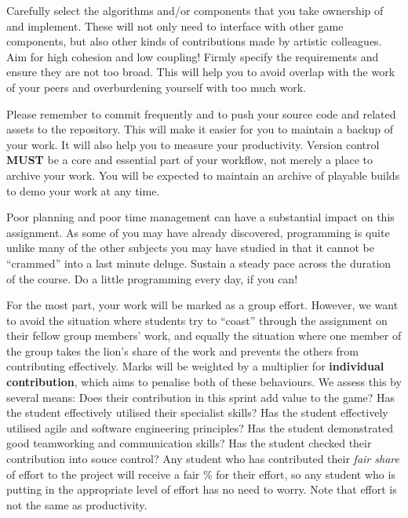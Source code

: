 \documentclass{../../fal_assignment}
\begin{document}
Carefully select the algorithms and/or components that you take ownership of and implement. These will not only need to interface with other game components, but also other kinds of contributions made by artistic colleagues. Aim for high cohesion and low coupling! Firmly specify the requirements and ensure they are not too broad. This will help you to avoid overlap with the work of your peers and overburdening yourself with too much work. 

Please remember to commit frequently and to push your source code and related assets to the repository. This will make it easier for you to maintain a backup of your work. It will also help you to measure your productivity. Version control \textbf{MUST} be a core and essential part of your workflow, not merely a place to archive your work. You will be expected to maintain an archive of playable builds to demo your work at any time.

Poor planning and poor time management can have a substantial impact on this assignment. As some of you may have already discovered, programming is quite unlike many of the other subjects you may have studied in that it cannot be ``crammed'' into a last minute deluge. Sustain a steady pace across the duration of the course. Do a little programming every day, if you can!

For the most part, your work will be marked as a group effort.
However, we want to avoid the situation where students try to ``coast'' through the assignment
on their fellow group members' work,
and equally the situation where one member of the group takes the lion's share of the work
and prevents the others from contributing effectively.
Marks will be weighted by a multiplier for \textbf{individual contribution}, which aims to penalise both of these behaviours.
We assess this by several means: Does their contribution in this sprint add value to the game? Has the student effectively utilised their specialist skills? Has the student effectively utilised agile and software engineering principles? Has the student demonstrated good teamworking and communication skills? Has the student checked their contribution into souce control? Any student who has contributed their \textit{fair share} of effort to the project will receive a fair \% for their effort,
so any student who is putting in the appropriate level of effort has no need to worry. Note that effort is not the same as productivity.

\end{document}
